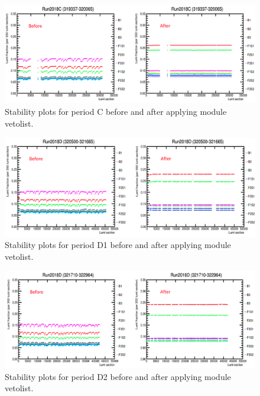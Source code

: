 \begin{figure}[!htp]
\centering
\includegraphics[width=1\textwidth]{ashish_thesis/Run2018C_before_after_stability.png}
\caption{%
  Stability plots for period C before and after applying module vetolist.
}
\label{fig:stability_C}
\end{figure}


\begin{figure}[!htp]
\centering
\includegraphics[width=1\textwidth]{ashish_thesis/Run2018D1_before_after_stability.png}
\caption{%
   Stability plots for period D1 before and after applying module vetolist.
}
\label{fig:stability_D1}
\end{figure}


\begin{figure}[!htp]
\centering
\includegraphics[width=1\textwidth]{ashish_thesis/Run2018D2_before_after_stability.png}
\caption{%
   Stability plots for period D2 before and after applying module vetolist.
}
\label{fig:stability_D2}
\end{figure}


